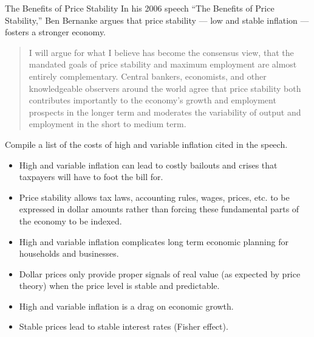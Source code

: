\documentclass[8pt]{extarticle}
\begin{document}
  \begin{problem}{The Benefits of Price Stability}
    In his 2006 speech ``The Benefits of Price Stability,'' Ben Bernanke argues that price stability --- low and stable inflation --- fosters a stronger economy.
    \begin{quote}
        I will argue for what I believe has become the consensus view, that the mandated goals of price stability and maximum employment are almost entirely complementary. Central bankers, economists, and other knowledgeable observers around the world agree that price stability both contributes importantly to the economy's growth and employment prospects in the longer term and moderates the variability of output and employment in the short to medium term.
    \end{quote}
    Compile a list of the costs of high and variable inflation cited in the speech.
    \tcblower
    \begin{itemize}
      \item High and variable inflation can lead to costly bailouts and crises that taxpayers will have to foot the bill for.
      \item Price stability allows tax laws, accounting rules, wages, prices, etc. to be expressed in dollar amounts rather than forcing these fundamental parts of the economy to be indexed.
      \item High and variable inflation complicates long term economic planning for households and businesses.
      \item Dollar prices only provide proper signals of real value (as expected by price theory) when the price level is stable and predictable.
      \item High and variable inflation is a drag on economic growth.
      \item Stable prices lead to stable interest rates (Fisher effect).
    \end{itemize}
  \end{problem}
\end{document}
